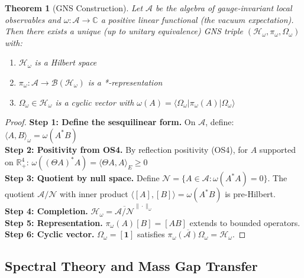 \documentclass[11pt,a4paper]{article}
\providecommand{\R}{\mathbb{R}}
\providecommand{\C}{\mathbb{C}}
\providecommand{\Hilbert}{\mathcal{H}}
\theoremstyle{plain}
\newtheorem{theorem}{Theorem}[section]
\theoremstyle{definition}
\begin{document}
\begin{theorem}[GNS Construction]
\label{thm:gns}\vspace{0.3em} 
Let $\mathcal{A}$ be the algebra of gauge-invariant local observables and $\omega: \mathcal{A} \to \C$ a positive linear functional (the vacuum expectation). Then there exists a unique (up to unitary equivalence) GNS triple $(\Hilbert_\omega, \pi_\omega, \Omega_\omega)$ with:
\begin{enumerate}[label=(\roman*)]
\item $\Hilbert_\omega$ is a Hilbert space
\item $\pi_\omega: \mathcal{A} \to \mathcal{B}(\Hilbert_\omega)$ is a
*-representation
\item $\Omega_\omega \in \Hilbert_\omega$ is a cyclic vector with
$\omega(A) = \langle\Omega_\omega|\pi_\omega(A)|\Omega_\omega\rangle$
\end{enumerate}
\end{theorem}
\vspace{0.6em} 
\begin{proof}
\textbf{Step 1: Define the sesquilinear form.}
On $\mathcal{A}$, define: $\langle A, B \rangle_\omega = \omega(A^*B)$
\vspace{0.6em}\\
\textbf{Step 2: Positivity from OS4.}
By reflection positivity (OS4), for $A$ supported on $\R^4_+$: $\omega((\Theta A)^* A) = \langle \Theta A, A \rangle_E \geq 0$
\vspace{0.6em}\\
\textbf{Step 3: Quotient by null space.}
Define $\mathcal{N} = \{A \in \mathcal{A} : \omega(A^*A) = 0\}$. The quotient $\mathcal{A}/\mathcal{N}$ with inner product $\langle [A], [B] \rangle = \omega(A^*B)$ is pre-Hilbert.
\vspace{0.6em}\\
\textbf{Step 4: Completion.}
$\Hilbert_\omega = \overline{\mathcal{A}/\mathcal{N}}^{\|\cdot\|_\omega}$
\vspace{0.6em}\\
\textbf{Step 5: Representation.}
$\pi_\omega(A)[B] = [AB]$ extends to bounded operators.
\vspace{0.6em}\\
\textbf{Step 6: Cyclic vector.}
$\Omega_\omega = [\mathbf{1}]$ satisfies $\overline{\pi_\omega(\mathcal{A})\Omega_\omega} = \Hilbert_\omega$.
\end{proof}

\subsection{Spectral Theory and Mass Gap Transfer}
\end{document}
